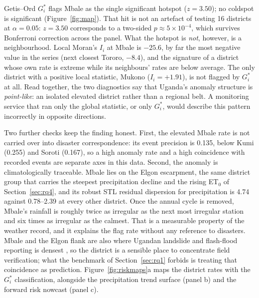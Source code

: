 \documentclass[preprint,12pt]{elsarticle}
\begin{document}
Getis--Ord $G_i^*$ flags Mbale as the single significant hotspot
($z=3.50$); no coldspot is significant (Figure~\ref{fig:map}). That hit is not
an artefact of
testing 16 districts at $\alpha=0.05$: $z=3.50$ corresponds to a two-sided
$p\approx5\times10^{-4}$, which survives Bonferroni correction across the
panel. What the hotspot is \emph{not}, however, is a neighbourhood. Local
Moran's $I_i$ at Mbale is $-25.6$, by far the most negative value in the
series (next closest Tororo, $-8.4$), and the signature of a district whose
own rate is extreme while its neighbours' rates are below average. The only
district with a positive local statistic, Mukono ($I_i=+1.91$), is not
flagged by $G_i^*$ at all. Read together, the two diagnostics say that
Uganda's anomaly structure is \emph{point-like}: an isolated elevated
district rather than a regional belt. A monitoring service that ran only the
global statistic, or only $G_i^*$, would describe this pattern incorrectly
in opposite directions.

Two further checks keep the finding honest. First, the elevated Mbale rate is not
carried over into disaster correspondence: its event precision is 0.135, below
Kumi (0.255) and Soroti (0.167), so a high anomaly rate and a high coincidence
with recorded events are separate axes in this data. Second, the anomaly is
climatologically traceable. Mbale lies on the Elgon escarpment, the same district
group that carries the steepest precipitation decline and the rising ET$_0$ of
Section~\ref{sec:rq4}, and its robust STL residual dispersion for precipitation
is 4.74 against 0.78--2.39 at every other district. Once the annual cycle is
removed, Mbale's rainfall is roughly twice as irregular as the next most
irregular station and six times as irregular as the calmest.
That is a measurable property of the weather record, and it explains the flag rate
without any reference to disasters. Mbale and the Elgon flank are also where Ugandan
landslide and flash-flood reporting is densest \cite{mugagga2012,namwano2024}, so the
district is a sensible place to concentrate field verification; what the benchmark of
Section~\ref{sec:rq1} forbids is treating that coincidence as prediction.
Figure~\ref{fig:riskmaps}a maps the district rates with the $G_i^*$ classification,
alongside the precipitation trend surface (panel b) and the forward risk nowcast
(panel c).
\end{document}
